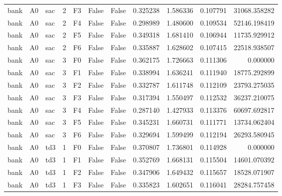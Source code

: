 \begin{tabular}{lllrlllrrrr}
      bank &      A0 &       sac &     2 &  F3 &           False &            False &  0.325238 &  1.586336 & 0.107791 &     31068.358282 \\
      bank &      A0 &       sac &     2 &  F4 &           False &            False &  0.298989 &  1.480600 & 0.109534 &     52146.198419 \\
      bank &      A0 &       sac &     2 &  F5 &           False &            False &  0.349318 &  1.681410 & 0.106944 &     11735.929912 \\
      bank &      A0 &       sac &     2 &  F6 &           False &            False &  0.335887 &  1.628602 & 0.107415 &     22518.938507 \\
      bank &      A0 &       sac &     3 &  F0 &           False &            False &  0.362175 &  1.726663 & 0.111306 &         0.000000 \\
      bank &      A0 &       sac &     3 &  F1 &           False &            False &  0.338994 &  1.636241 & 0.111940 &     18775.292899 \\
      bank &      A0 &       sac &     3 &  F2 &           False &            False &  0.332787 &  1.611748 & 0.112109 &     23793.275035 \\
      bank &      A0 &       sac &     3 &  F3 &           False &            False &  0.317394 &  1.550497 & 0.112532 &     36237.210075 \\
      bank &      A0 &       sac &     3 &  F4 &           False &            False &  0.287140 &  1.427933 & 0.113376 &     60697.692817 \\
      bank &      A0 &       sac &     3 &  F5 &           False &            False &  0.345231 &  1.660731 & 0.111771 &     13734.062404 \\
      bank &      A0 &       sac &     3 &  F6 &           False &            False &  0.329694 &  1.599499 & 0.112194 &     26293.580945 \\
      bank &      A0 &       td3 &     1 &  F0 &           False &            False &  0.370807 &  1.736801 & 0.114928 &         0.000000 \\
      bank &      A0 &       td3 &     1 &  F1 &           False &            False &  0.352769 &  1.668131 & 0.115504 &     14601.070392 \\
      bank &      A0 &       td3 &     1 &  F2 &           False &            False &  0.347906 &  1.649432 & 0.115657 &     18528.071907 \\
      bank &      A0 &       td3 &     1 &  F3 &           False &            False &  0.335823 &  1.602651 & 0.116041 &     28284.757458 \\

\end{tabular}
